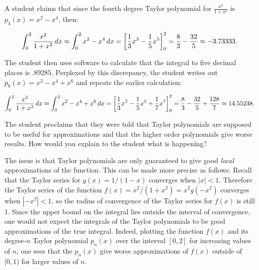\documentclass[noauthor]{ximera}
\begin{document}
\begin{problem} 
A student claims that since the fourth degree Taylor polynomial for $\frac{x^2}{1+x^2}$ is $p_4(x) = x^2-x^4$, then:

\[\int_0^2 \frac{x^2}{1+x^2} \mathop{}\!d x \approx \int_0^2 x^2-x^4 \mathop{}\!d x = \bigg[ \frac{1}{3}x^3-\frac{1}{5}x^5 \bigg]_0^2 = \frac{8}{3}-\frac{32}{5} \approx -3.73333.\]

The student then uses software to calculate that the integral to five decimal places is $.89285$.  Perplexed by this discrepancy, the student writes out $p_6(x) = x^2-x^4+x^6$  and repeats the earlier calculation:

\[\int_0^2 \frac{x^2}{1+x^2} \mathop{}\!d x \approx \int_0^2 x^2-x^4+x^6 \mathop{}\!d x = \bigg[ \frac{1}{3}x^3-\frac{1}{5}x^5+\frac{1}{7}x^7 \bigg]_0^2 = \frac{8}{3}-\frac{32}{5} +\frac{128}{7} \approx 14.55238.\]

The student proclaims that they were told that Taylor polynomials are supposed to be useful for approximations and that the higher order polynomials give worse results.  How would you explain to the student what is happening?

\begin{freeResponse}
The issue is that Taylor polynomials are only guaranteed to give good \emph{local} approximations of the function. This can be made more precise as follows. Recall that the Taylor series for $g(x)=1/(1-x)$ converges when $|x|<1$. Therefore the Taylor series of the function $f(x)=x^2/(1+x^2) = x^2 g(-x^2)$ converges when $|-x^2| <1$, so the radius of convergence of the Taylor series for $f(x)$ is still $1$. Since the upper bound on the integral lies outside the interval of convergence, one would not expect the integrals of the Taylor polynomials to be good approximations of the true integral. Indeed, plotting the function $f(x)$ and its degree-$n$ Taylor polynomial $p_n(x)$ over the interval $[0,2]$ for increasing values of $n$, one sees that the $p_n(x)$ give worse approximations of $f(x)$ outside of $[0,1)$ for larger values of $n$.
\end{freeResponse}
\end{problem}
\end{document}

